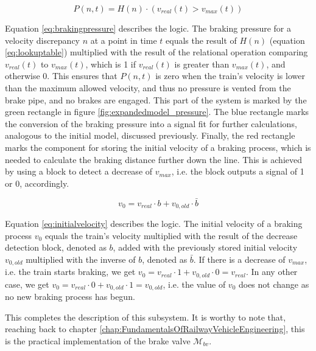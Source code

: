 \begin{equation}
\label{eq:brakingpressure}
P(n,t) = H(n) \cdot (v_{real}(t) > v_{max}(t))
\end{equation}

\noindent
Equation \ref{eq:brakingpressure} describes the logic. The braking pressure for a velocity discrepancy $n$ at a point in time $t$ equals the result of $H(n)$ (equation \ref{eq:lookuptable}) multiplied with the result of the relational operation comparing $v_{real}(t)$ to $v_{max}(t)$, which is 1 if $v_{real}(t)$ is greater than $v_{max}(t)$, and otherwise 0. This ensures that $P(n,t)$ is zero when the train's velocity is lower than the maximum allowed velocity, and thus no pressure is vented from the brake pipe, and no brakes are engaged. This part of the system is marked by the green rectangle in figure \ref{fig:expandedmodel_pressure}. The blue rectangle marks the conversion of the braking pressure into a signal fit for further calculations, analogous to the initial model, discussed previously. Finally, the red rectangle marks the component for storing the initial velocity of a braking process, which is needed to calculate the braking distance further down the line. This is achieved by using a block to detect a decrease of $v_{max}$, i.e. the block outputs a signal of 1 or 0, accordingly. 

\begin{equation}
\label{eq:initialvelocity}
v_{0} = v_{real} \cdot b + v_{0,old} \cdot \bar{b}
\end{equation}

\noindent
Equation \ref{eq:initialvelocity} describes the logic. The initial velocity of a braking process $v_{0}$ equals the train's velocity multiplied with the result of the decrease detection block, denoted as $b$, added with the previously stored initial velocity $v_{0,old}$ multiplied with the inverse of $b$, denoted as $\bar{b}$. If there is a decrease of $v_{max}$, i.e. the train starts braking, we get $v_{0} = v_{real} \cdot 1 + v_{0,old} \cdot 0 = v_{real}$. In any other case, we get $v_{0} = v_{real} \cdot 0 + v_{0,old} \cdot 1 = v_{0,old}$, i.e. the value of $v_{0}$ does not change as no new braking process has begun.
\par
This completes the description of this subsystem. It is worthy to note that, reaching back to chapter \ref{chap:FundamentalsOfRailwayVehicleEngineering}, this is the practical implementation of the brake valve ${\mathcal{M}}_{bv}$.

